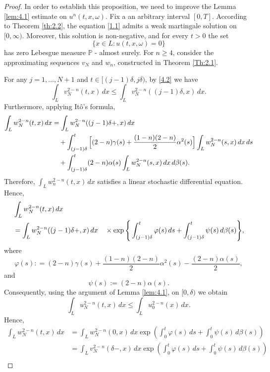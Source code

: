 \documentclass[a4paper,12pt]{article}
\numberwithin{equation}{section}
\def\f{\varphi}
\def\f{\varphi}
\begin{document}
\begin{proof}
In order to establish this proposition, we need to improve the Lemma \ref{lem:4.1} estimate on $u^{n}(t,x,\omega)$. Fix a an arbitrary interval $[0,T]$. According to Theorem \ref{th:2.2}, the equation \eqref{1.1} admits a weak martingale solution on $[0,\infty)$. Moreover, this solution is non-negative, and for every $t>0$ the set
\[
\{ x \in L : u(t,x,\omega)=0 \}
\]
has zero Lebesgue measure $\mathbb{P}$ - almost surely.
For $n \ge 4$, consider the approximating sequences
$v_N$ and $w_n$, constructed in Theorem \ref{Th:2.1}.

For any $j=1,\dots,N+1$ and
$t \in [(j-1)\delta,j\delta)$, by \eqref{4.2} we have 
\begin{equation*}
\int_{L} v_N^{2-n}(t,x)\,dx
\le
\int_{L} v_N^{2-n}((j-1)\delta,x)\,dx.
\label{5.1}
\end{equation*}
Furthermore, applying It\^o's formula,
\begin{align*}
\int_{L} w_N^{2-n}(t,x)\,dx
&=
\int_{L} w_N^{2-n}((j-1)\delta+,x)\,dx \notag \\
&\quad
+ \int_{(j-1)\delta}^{t}
\Big[(2-n)\gamma(s)
+ \frac{(1-n)(2-n)}{2}\alpha^2(s)\Big]
\int_{L} w_N^{2-n}(s,x)\,dx\,ds \notag \\
&\quad
+ \int_{(j-1)\delta}^{t}
(2-n)\alpha(s)
\int_{L} w_N^{2-n}(s,x)\,dx\, d\beta(s).
\label{5.2}
\end{align*}
Therefore, $\displaystyle \int_{L} w_n^{2-n}(t,x)\,dx$
satisfies a linear stochastic differential equation.
Hence,
\begin{align*}
&\int_{L} w_N^{2-n}(t,x)\,dx \\
& =
\int_{L} w_N^{2-n}((j-1)\delta+,x)\,dx  \notag 
\quad \times
\exp\Bigg\{
\int_{(j-1)\delta}^{t}
\varphi(s)\,ds
+
\int_{(j-1)\delta}^{t}
\psi(s)\,d\beta(s)
\Bigg\},
\end{align*}
where
\[
\f(s): = (2-n)\gamma(s)
+ \frac{(1-n)(2-n)}{2}\alpha^2(s) - \frac{(2-n)\alpha(s)}{2},
\]
and 
\[
\psi(s):= (2-n) \alpha(s).
\]
Consequently, using the argument of Lemma \ref{lem:4.1}, on $[0, \delta)$ we obtain
\begin{equation*}
\int_{L} u_N^{2-n}(t,x)\,dx
\le
\int_{L} u_0^{2-n}(x)\,dx.
\end{equation*}
Hence,
\begin{align*}
    \int_{L} w_N^{2-n}(t,x)\,dx
& = \int_{L} w_N^{2-n}(0,x)\,dx
\exp\left( \int_0^t \varphi(s)\,ds + \int_0^t \psi(s)\,d\beta(s) \right) \\
& = \int_{L} v_N^{2-n}(\delta-,x)\,dx
\exp\left( \int_0^t \varphi(s)\,ds + \int_0^t \psi(s)\,d\beta(s) \right) \\

\end{align*}
\end{proof}
\end{document}
